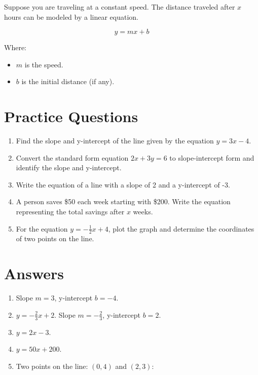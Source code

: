 \documentclass{article}
\begin{document}
Suppose you are traveling at a constant speed. The distance traveled after \( x \) hours can be modeled by a linear equation.

\[
y = mx + b
\]

Where:
\begin{itemize}
    \item \( m \) is the speed.
    \item \( b \) is the initial distance (if any).
\end{itemize}

\newpage

\section*{Practice Questions}

\begin{enumerate}
    \item Find the slope and y-intercept of the line given by the equation \( y = 3x - 4 \).
    \item Convert the standard form equation \( 2x + 3y = 6 \) to slope-intercept form and identify the slope and y-intercept.
    \item Write the equation of a line with a slope of 2 and a y-intercept of -3.
    \item A person saves \$50 each week starting with \$200. Write the equation representing the total savings after \( x \) weeks.
    \item For the equation \( y = -\frac{1}{2}x + 4 \), plot the graph and determine the coordinates of two points on the line.
\end{enumerate}

\section*{Answers}

\begin{enumerate}
    \item Slope \( m = 3 \), y-intercept \( b = -4 \).
    \item \( y = -\frac{2}{3}x + 2 \). Slope \( m = -\frac{2}{3} \), y-intercept \( b = 2 \).
    \item \( y = 2x - 3 \).
    \item \( y = 50x + 200 \).
    \item Two points on the line: \((0, 4)\) and \((2, 3)\):
\end{enumerate}
\end{document}
